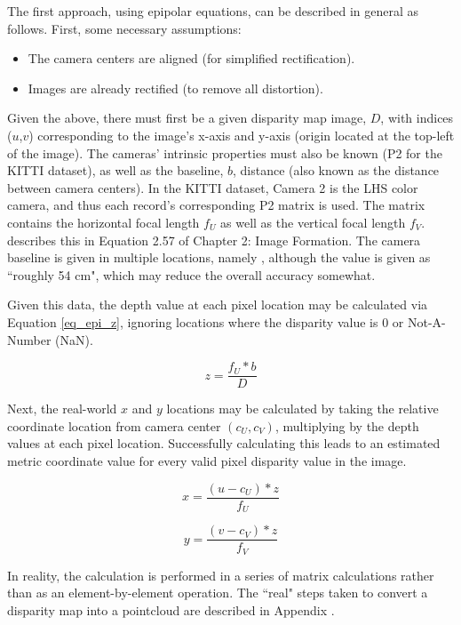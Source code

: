 The first approach, using epipolar equations, can be described in general as follows. First, some necessary assumptions:
\begin{itemize} \itemsep=-0.5em
	\item The camera centers are aligned (for simplified rectification).
	\item Images are already rectified (to remove all distortion).
\end{itemize}

Given the above, there must first be a given disparity map image, $D$, with indices ($u$,$v$) corresponding to the image's x-axis and y-axis (origin located at the top-left of the image). The cameras' intrinsic properties must also be known (P2 for the KITTI dataset), as well as the baseline, $b$, distance (also known as the distance between camera centers). In the KITTI dataset, Camera 2 is the LHS color camera, and thus each record's corresponding P2 matrix is used. The matrix contains the horizontal focal length $f_U$ as well as the vertical focal length $f_V$. \cite{szeliski_computer_2010} describes this in Equation 2.57 of Chapter 2: Image Formation. The camera baseline is given in multiple locations, namely \cite{geiger_are_2012}, although the value is given as ``roughly 54 cm", which may reduce the overall accuracy somewhat.

Given this data, the depth value at each pixel location may be calculated via Equation \ref{eq_epi_z}, ignoring locations where the disparity value is 0 or Not-A-Number (NaN).

\begin{equation}
z = \frac{f_U * b}{D}
\label{eq_epi_z}
\end{equation}

Next, the real-world $x$ and $y$ locations may be calculated by taking the relative coordinate location from camera center $(c_U,c_V)$, multiplying by the depth values at each pixel location. Successfully calculating this leads to an estimated metric coordinate value for every valid pixel disparity value in the image.

\begin{equation}
x = \frac{(u - c_U) * z}{f_U}
\end{equation}

\begin{equation}
y = \frac{(v - c_V) * z}{f_V}
\end{equation}

In reality, the calculation is performed in a series of matrix calculations rather than as an element-by-element operation. The ``real" steps taken to convert a disparity map into a pointcloud are described in Appendix .

